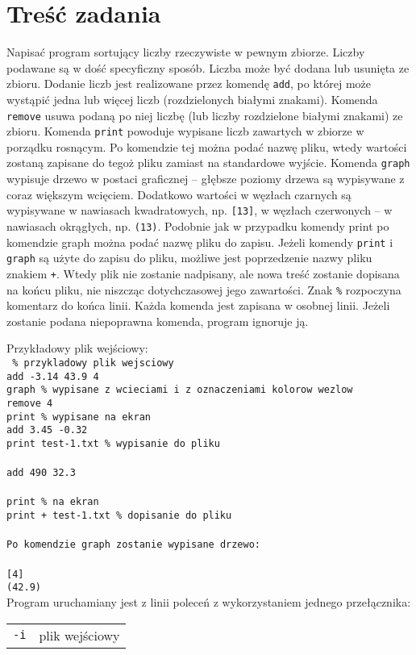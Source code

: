 \documentclass[12pt,a4paper,twoside]{article}
\begin{document}
\section{Treść zadania}
Napisać program sortujący liczby rzeczywiste w pewnym zbiorze. Liczby podawane są w dość specyﬁczny sposób. Liczba może być dodana lub usunięta ze zbioru. Dodanie liczb jest realizowane przez komendę \texttt{add}, po której może wystąpić jedna lub więcej liczb (rozdzielonych białymi znakami). Komenda \texttt{remove} usuwa podaną po niej liczbę (lub liczby rozdzielone białymi znakami) ze zbioru. Komenda \texttt{print} powoduje wypisane liczb zawartych w zbiorze w porządku rosnącym. Po komendzie tej można podać nazwę pliku, wtedy wartości zostaną zapisane do tegoż pliku zamiast na standardowe wyjście. Komenda \texttt{graph} wypisuje drzewo w postaci graﬁcznej – głębsze poziomy drzewa są wypisywane z coraz większym wcięciem. Dodatkowo wartości w węzłach czarnych są wypisywane w nawiasach kwadratowych, np. \texttt{[13]}, w węzłach czerwonych – w nawiasach okrągłych, np. \texttt{(13)}. Podobnie jak w przypadku komendy print po komendzie graph można podać nazwę pliku do zapisu. Jeżeli komendy \texttt{print} i \texttt{graph} są użyte do zapisu do pliku, możliwe jest poprzedzenie nazwy pliku znakiem \texttt{+}. Wtedy plik nie zostanie nadpisany, ale nowa treść zostanie dopisana na końcu pliku, nie niszcząc dotychczasowej jego zawartości. Znak \texttt{\%} rozpoczyna komentarz do końca linii. Każda komenda jest zapisana w osobnej linii. Jeżeli zostanie podana niepoprawna komenda, program ignoruje ją. \par

Przykładowy plik wejściowy:\\
\texttt{
\% przykladowy plik wejsciowy\\
add -3.14 43.9 4\\
graph \% wypisane z wcieciami i z oznaczeniami kolorow wezlow \\
remove 4\\
print \% wypisane na ekran\\
add 3.45 -0.32\\
print test-1.txt \% wypisanie do pliku\\
\\
add 490 32.3\\
\\
print \% na ekran \\
print + test-1.txt \% dopisanie do pliku\\
\\
\textrm{Po komendzie \texttt{graph} zostanie wypisane drzewo:} \\
\\
{[4]}\\
\indent(42.9) \\
\break
}
Program uruchamiany jest z linii poleceń z wykorzystaniem jednego przełącznika: \par
\begin{tabular}{ll}
\texttt {-i} & plik wejściowy \\ 
\end{tabular}
\end{document}
